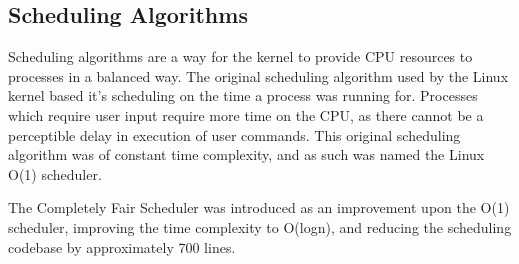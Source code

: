 \subsection{Scheduling Algorithms}

Scheduling algorithms are a way for the kernel to provide CPU resources to
processes in a balanced way. The original scheduling algorithm used by the
Linux kernel based it's scheduling on the time a process was running for.
Processes which require user input require more time on the CPU, as there cannot
be a perceptible delay in execution of user commands. This original scheduling
algorithm was of constant time complexity, and as such was named the Linux O(1)
scheduler\cite{pabla_2009}.

The Completely Fair Scheduler was introduced as an improvement upon the O(1)
scheduler, improving the time complexity to O(logn), and reducing the scheduling
codebase by approximately 700 lines\cite{molnar_2007}.
